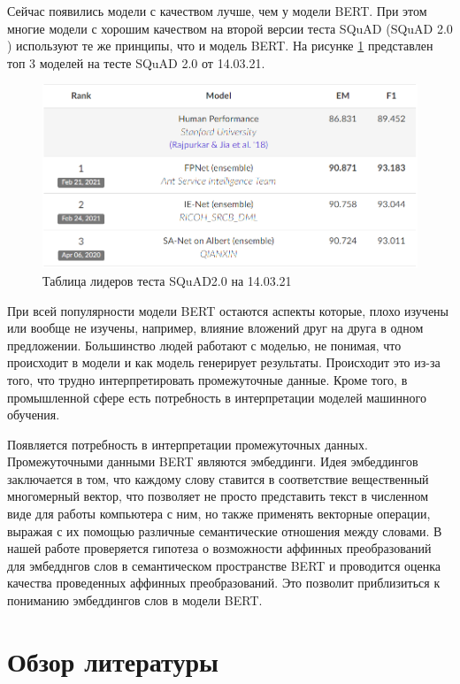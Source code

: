 \documentclass[a4paper,14pt]{article}
\begin{document}
	Сейчас появились модели с качеством лучше, чем у модели BERT. 
	При этом многие модели с хорошим качеством на второй версии теста SQuAD \cite{SQuAD} (SQuAD 2.0 \cite{SQuAD2}) используют те же принципы, что и модель BERT.
	На рисунке \ref{fig:quality140321} представлен топ 3 моделей на тесте SQuAD 2.0 \cite{SQuAD2} от 14.03.21.
	
	\begin{figure}[H]
		\centering
		\includegraphics[width=0.6\linewidth]{images/quality_14_03_21}
		\caption{Таблица лидеров теста SQuAD2.0 на 14.03.21}
		\label{fig:quality140321}
	\end{figure}

	При всей популярности модели BERT остаются аспекты которые, плохо изучены или вообще не изучены, например, влияние вложений друг на друга в одном предложении.
	Большинство людей работают с моделью, не понимая, что происходит в модели и как модель генерирует результаты.
	Происходит это из-за того, что трудно интерпретировать промежуточные данные.
	Кроме того, в промышленной сфере есть потребность в интерпретации моделей машинного обучения.
	
	Появляется потребность в интерпретации промежуточных данных.
	Промежуточными данными BERT являются эмбеддинги.
	Идея эмбеддингов заключается в том, что каждому слову ставится в соответствие вещественный многомерный вектор, что позволяет не просто представить текст в численном виде для работы компьютера с ним, но также применять векторные операции, выражая с их помощью различные семантические отношения между словами. 
	В нашей работе проверяется гипотеза о возможности аффинных преобразований для эмбедднгов слов в семантическом пространстве BERT и проводится оценка качества проведенных аффинных преобразований.
	Это позволит приблизиться к пониманию эмбеддингов слов в модели BERT.
	

	
	
	

	\pagebreak
	
	\section{Обзор литературы}
	
\end{document}
